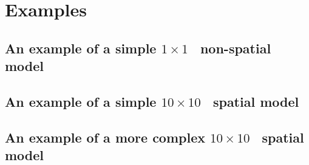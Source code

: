 
\section{Examples\label{sec:examples}}

\subsection{An example of a simple
  \texorpdfstring{$ 1 \times 1 $}{%
    1 x 1
  }%
\ non-spatial model\label{example1}} 

 

\subsection{An example of a simple
  \texorpdfstring{$ 10 \times 10 $}{%
    10 x 10 
  }%
\ spatial model\label{example2}} 

 

\subsection{An example of a more complex
  \texorpdfstring{$ 10 \times 10 $}{%
    10 x 10 
  }%
\ spatial model\label{example3}} 

 
